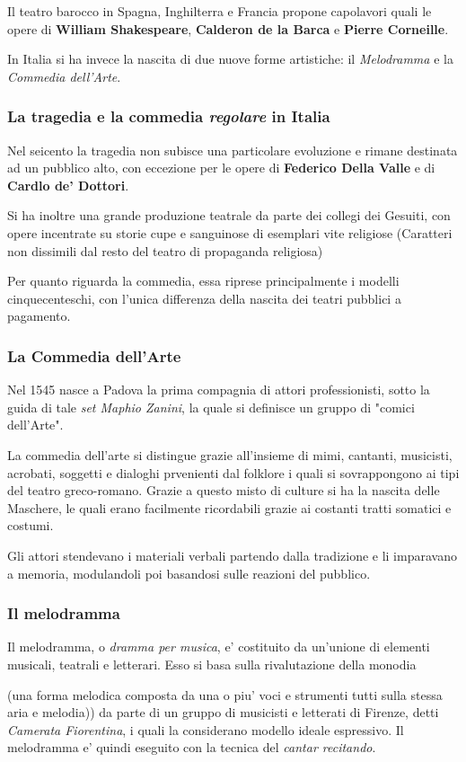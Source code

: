 \documentclass{article}
\begin{document}
{    Il teatro barocco in Spagna, Inghilterra e Francia propone capolavori quali le opere di \textbf{William Shakespeare}, \textbf{Calderon de la Barca} e \textbf{Pierre Corneille}.

    In Italia si ha invece la nascita di due nuove forme artistiche: il \textit{Melodramma} e la \textit{Commedia dell'Arte}.

    \subsubsection{La tragedia e la commedia \textit{regolare} in Italia}
    Nel seicento la tragedia non subisce una particolare evoluzione e rimane destinata ad un pubblico alto, con eccezione per le opere di \textbf{Federico Della Valle} e di \textbf{Cardlo de' Dottori}.

    Si ha inoltre una grande produzione teatrale da parte dei collegi dei Gesuiti, con opere incentrate su storie cupe e sanguinose di esemplari vite religiose \small{(Caratteri non dissimili dal resto del teatro di propaganda religiosa)}

    Per quanto riguarda la commedia, essa riprese principalmente i modelli cinquecenteschi, con l'unica differenza della nascita dei teatri pubblici a pagamento.

    \subsubsection{La Commedia dell'Arte}
    Nel 1545 nasce a Padova la prima compagnia di attori professionisti, sotto la guida di tale \textit{set Maphio Zanini}, la quale si definisce un gruppo di "comici dell'Arte".
    
    La commedia dell'arte si distingue grazie all'insieme di mimi, cantanti, musicisti, acrobati, soggetti e dialoghi prvenienti dal folklore i quali si sovrappongono ai tipi del teatro greco-romano. Grazie a questo misto di culture si ha la nascita delle Maschere, le quali erano facilmente ricordabili grazie ai costanti tratti somatici e costumi.

    Gli attori stendevano i materiali verbali partendo dalla tradizione e li imparavano a memoria, modulandoli poi basandosi sulle reazioni del pubblico.

    \subsubsection{Il melodramma}
    Il melodramma, o \textit{dramma per musica}, e' costituito da un'unione di elementi musicali, teatrali e letterari. Esso si basa sulla rivalutazione della monodia \small{(una forma melodica composta da una o piu' voci e strumenti tutti sulla stessa aria e melodia)) da parte di un gruppo di musicisti e letterati di Firenze, detti \textit{Camerata Fiorentina}, i quali la considerano modello ideale espressivo. Il melodramma e' quindi eseguito con la tecnica del \textit{cantar recitando}.

}}
\end{document}
